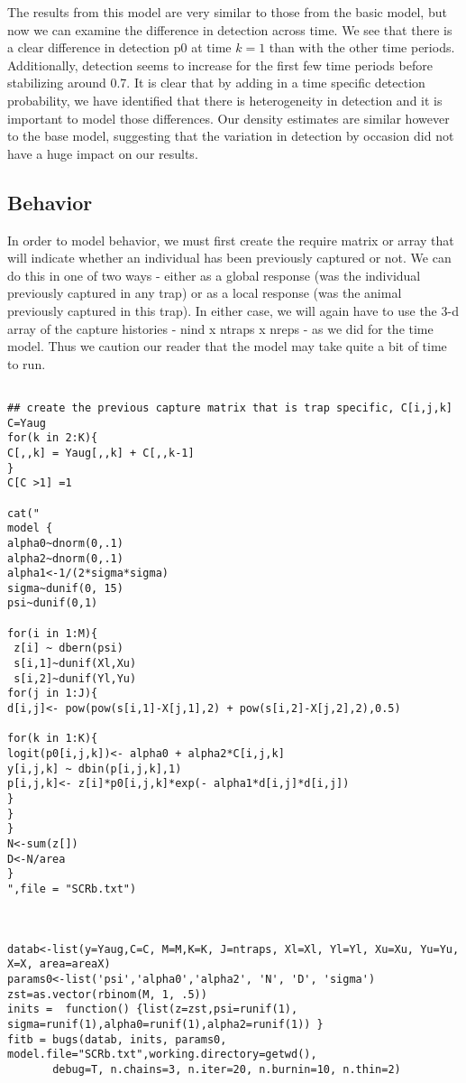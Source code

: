The results from this model are very similar to those from the basic
model, but now we can examine the difference in detection across time.
We see that there is a clear difference in detection p0 at time $k=1$
than with the other time periods.  Additionally, detection seems to
increase for the first few time periods before stabilizing around 0.7.
It is clear that by adding in a time specific detection probability,
we have identified that there is heterogeneity in detection and it is
important to model those differences.  Our density estimates are
similar however to the base model, suggesting that the variation in
detection by occasion did not have a huge impact on our results. 

\subsection{Behavior}

In order to model behavior, we must first create the require matrix or array that will indicate whether an individual has been previously captured or not.  We can do this in one of two ways - either as a global response (was the individual previously captured in any trap) or as a local response (was the animal previously captured in this trap).   In either case, we will again have to use the 3-d array of the capture histories - nind x ntraps x nreps - as we did for the time model.  Thus we caution our reader that the model may take quite a bit of time to run.


{\small
\begin{verbatim}

## create the previous capture matrix that is trap specific, C[i,j,k]
C=Yaug
for(k in 2:K){
C[,,k] = Yaug[,,k] + C[,,k-1]
}
C[C >1] =1

cat("
model {
alpha0~dnorm(0,.1)
alpha2~dnorm(0,.1)
alpha1<-1/(2*sigma*sigma)
sigma~dunif(0, 15)
psi~dunif(0,1)

for(i in 1:M){
 z[i] ~ dbern(psi)
 s[i,1]~dunif(Xl,Xu)
 s[i,2]~dunif(Yl,Yu)
for(j in 1:J){
d[i,j]<- pow(pow(s[i,1]-X[j,1],2) + pow(s[i,2]-X[j,2],2),0.5)

for(k in 1:K){
logit(p0[i,j,k])<- alpha0 + alpha2*C[i,j,k]
y[i,j,k] ~ dbin(p[i,j,k],1)
p[i,j,k]<- z[i]*p0[i,j,k]*exp(- alpha1*d[i,j]*d[i,j])
}
}
}
N<-sum(z[])
D<-N/area
}
",file = "SCRb.txt")



datab<-list(y=Yaug,C=C, M=M,K=K, J=ntraps, Xl=Xl, Yl=Yl, Xu=Xu, Yu=Yu, X=X, area=areaX)
params0<-list('psi','alpha0','alpha2', 'N', 'D', 'sigma')
zst=as.vector(rbinom(M, 1, .5))
inits =  function() {list(z=zst,psi=runif(1), sigma=runif(1),alpha0=runif(1),alpha2=runif(1)) }
fitb = bugs(datab, inits, params0, model.file="SCRb.txt",working.directory=getwd(),    
       debug=T, n.chains=3, n.iter=20, n.burnin=10, n.thin=2)

\end{verbatim}
}



